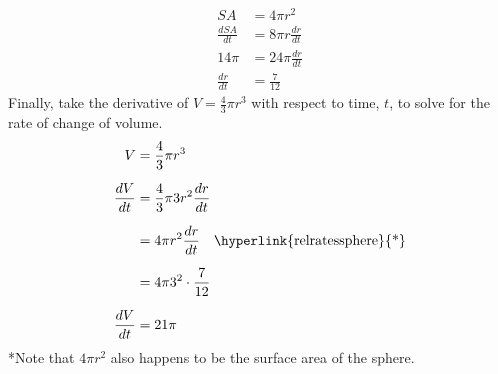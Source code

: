 \documentclass[12pt]{article}
\begin{document}
\begin{enumerate}
                \begin{align*}
                    SA &= 4 \pi r^2 \\
                    \frac{dSA}{dt} &= 8 \pi r \frac{dr}{dt} \\[6pt]
                    14 \pi &= 24 \pi \frac{dr}{dt} \\[6pt]
                    \frac{dr}{dt} &= \frac{7}{12}
                \end{align*}
                Finally, take the derivative of $V = \frac{4}{3} \pi r^3$ with respect to time, $t$, to solve for the rate of change of volume.
                \begin{align*}
                    V &= \frac{4}{3} \pi r^3 \\[6pt]
                    \frac{dV}{dt} &= \frac{4}{3} \pi 3r^2 \frac{dr}{dt} \\[6pt]
                    &= 4 \pi r^2 \frac{dr}{dt} \quad \text{\hyperlink{relratessphere}{*}}\\[6pt]
                    &= 4 \pi 3^2 \cdot \frac{7}{12} \\[6pt]
                    \frac{dV}{dt} &= 21 \pi
                \end{align*}
                \hypertarget{relratessphere}{*}Note that $4 \pi r^2$ also happens to be the surface area of the sphere.
            \end{enumerate}
\end{document}

